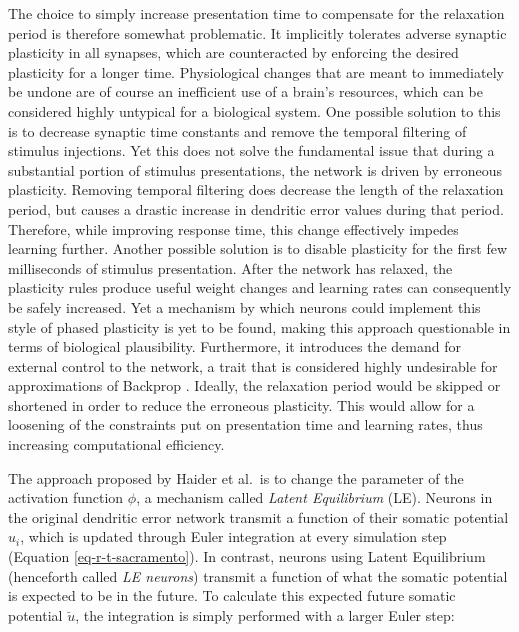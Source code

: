 The choice to simply increase presentation time to compensate for the relaxation period is therefore somewhat
problematic. It implicitly tolerates adverse synaptic plasticity in all synapses, which are counteracted by enforcing
the desired plasticity for a longer time. Physiological changes that are meant to immediately be undone are of course an
inefficient use of a brain's resources, which can be considered highly untypical for a biological system. One possible
solution to this is to decrease synaptic time constants and remove the temporal filtering of stimulus injections. Yet
this does not solve the fundamental issue that during a substantial portion of stimulus presentations, the network is
driven by erroneous plasticity. Removing temporal filtering does decrease the length of the relaxation period, but
causes a drastic increase in dendritic error values during that period. Therefore, while improving response time, this
change effectively impedes learning further. Another possible solution is to disable plasticity for the first few milliseconds
of stimulus presentation. After the network has relaxed, the plasticity rules produce useful weight changes and learning
rates can consequently be safely increased. Yet a mechanism by which neurons could implement this style of phased
plasticity is yet to be found, making this approach questionable in terms of biological plausibility. Furthermore, it
introduces the demand for external control to the network, a trait that is considered highly undesirable for
approximations of Backprop \citep{whittington2019theories}. Ideally, the relaxation period would be skipped or
shortened in order to reduce the erroneous plasticity. This would allow for a loosening of the constraints put on
presentation time and learning rates, thus increasing computational efficiency.



The approach proposed by Haider et al.\ is to change the parameter of the activation function $\phi$, a mechanism called
\textit{Latent Equilibrium} (LE). Neurons in the original dendritic error network transmit a function of their somatic
potential $u_i$, which is updated through Euler integration at every simulation step (Equation \ref{eq-r-t-sacramento}).
In contrast, neurons using Latent Equilibrium (henceforth called \textit{LE neurons}) transmit a function of what the
somatic potential is expected to be in the future. To calculate this expected future somatic potential $\breve{u}$, the
integration is simply performed with a larger Euler step:

